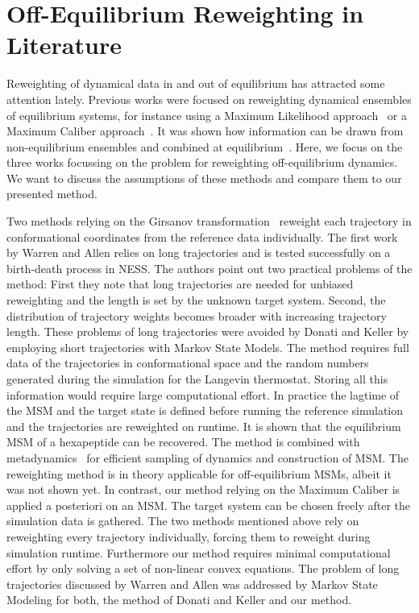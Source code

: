 \section{Off-Equilibrium Reweighting in Literature}
Reweighting of dynamical data in and out of equilibrium has attracted some attention lately. Previous works were focused on reweighting dynamical ensembles of equilibrium systems, for instance using a Maximum Likelihood approach~\cite{chodera2011dynamical} or a Maximum Caliber approach~\cite{wan2016maximum}. It was shown how information can be drawn from non-equilibrium ensembles and combined at equilibrium~\cite{wu2016multiensemble}.  Here, we focus on the three works focussing on the problem for reweighting off-equilibrium dynamics. We want to discuss the assumptions of these methods and  compare them to our presented method. 

Two methods relying on the  Girsanov transformation~\cite{donati2017girsanov,warren2018trajectory} reweight each trajectory in conformational coordinates from the reference data individually. 
The first work by Warren and Allen relies on long trajectories and is tested successfully on a birth-death process in NESS. The authors point out two practical problems of the method: First they note that long trajectories are needed for unbiased reweighting and the length is set by the unknown target system. Second, the distribution of trajectory weights becomes broader with increasing trajectory length. These problems of long trajectories were avoided by Donati and Keller by employing short trajectories with Markov State Models. The method requires full data of the trajectories in conformational space and the random numbers generated during the simulation for the Langevin thermostat. Storing all this information would require large computational effort. In practice the lagtime of the MSM and the target state is defined before running the reference simulation and the trajectories are reweighted on runtime. It is  shown that the equilibrium MSM of a hexapeptide can be recovered. The method is combined with metadynamics~\cite{donati2018Girsanov} for efficient sampling of dynamics and construction of MSM. The reweighting method is in theory applicable for off-equilibrium MSMs, albeit it was not shown yet. In contrast, our method relying on the Maximum Caliber is applied a posteriori on an MSM. The target system can be chosen freely after the simulation data is gathered. The two methods mentioned above rely on reweighting every trajectory individually, forcing them to reweight during simulation runtime. Furthermore our method requires minimal computational effort by only solving a set of non-linear convex equations. The problem of long trajectories discussed by Warren and Allen was addressed by Markov State Modeling for both, the method of Donati and Keller and our method. 

